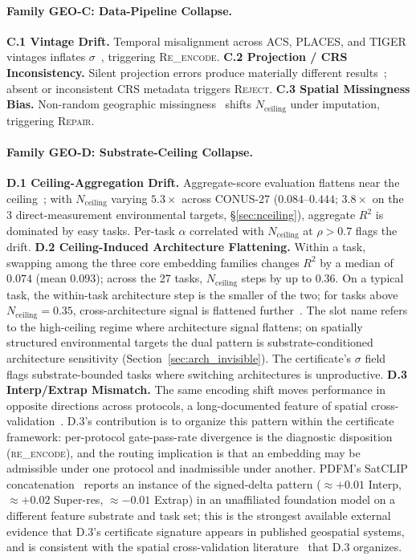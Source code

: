 \documentclass{article}
\begin{document}
\paragraph{Family GEO-C: Data-Pipeline Collapse.}
\textbf{C.1 Vintage Drift.} Temporal misalignment across ACS, PLACES, and TIGER vintages inflates $\sigma$~\citep{kwon2023acs}, triggering \textsc{Re\_encode}.
\textbf{C.2 Projection / CRS Inconsistency.} Silent projection errors produce materially different results~\citep{cao2017projection}; absent or inconsistent CRS metadata triggers \textsc{Reject}.
\textbf{C.3 Spatial Missingness Bias.} Non-random geographic missingness~\citep{rubin1976missing,oliver2005cartographic} shifts $N_{\text{ceiling}}$ under imputation, triggering \textsc{Repair}.

\paragraph{Family GEO-D: Substrate-Ceiling Collapse.}
\textbf{D.1 Ceiling-Aggregation Drift.} Aggregate-score evaluation flattens near the ceiling~\citep{ott2022saturation,kiela2021dynabench}; with $N_{\text{ceiling}}$ varying $5.3{\times}$ across CONUS-27 ($0.084$--$0.444$; $3.8{\times}$ on the 3 direct-measurement environmental targets, \S\ref{sec:nceiling}), aggregate $R^2$ is dominated by easy tasks. Per-task $\alpha$ correlated with $N_{\text{ceiling}}$ at $\rho > 0.7$ flags the drift.
\textbf{D.2 Ceiling-Induced Architecture Flattening.} Within a task, swapping among the three core embedding families changes $R^2$ by a median of $0.074$ (mean $0.093$); across the 27 tasks, $N_{\text{ceiling}}$ steps by up to $0.36$. On a typical task, the within-task architecture step is the smaller of the two; for tasks above $N_{\text{ceiling}} = 0.35$, cross-architecture signal is flattened further~\citep{ott2022saturation}. The slot name refers to the high-ceiling regime where architecture signal flattens; on spatially structured environmental targets the dual pattern is substrate-conditioned architecture sensitivity (Section~\ref{sec:arch_invisible}). The certificate's $\sigma$ field flags substrate-bounded tasks where switching architectures is unproductive.
\textbf{D.3 Interp/Extrap Mismatch.} The same encoding shift moves performance in opposite directions across protocols, a long-documented feature of spatial cross-validation~\citep{roberts2017cv,ploton2020spatial,mila2022nndm}. D.3's contribution is to organize this pattern within the certificate framework: per-protocol gate-pass-rate divergence is the diagnostic disposition (\textsc{re\_encode}), and the routing implication is that an embedding may be admissible under one protocol and inadmissible under another. PDFM's SatCLIP concatenation~\citep[Table~4]{agarwal2025pdfm} reports an instance of the signed-delta pattern (${\approx}{+}0.01$ Interp, ${\approx}{+}0.02$ Super-res, ${\approx}{-}0.01$ Extrap) in an unaffiliated foundation model on a different feature substrate and task set; this is the strongest available external evidence that D.3's certificate signature appears in published geospatial systems, and is consistent with the spatial cross-validation literature~\citep{roberts2017cv,ploton2020spatial,mila2022nndm} that D.3 organizes.
\end{document}
